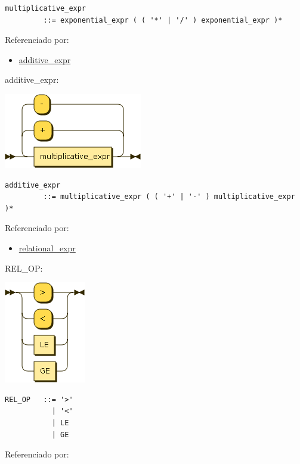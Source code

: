 \begin{verbatim}
multiplicative_expr
         ::= exponential_expr ( ( '*' | '/' ) exponential_expr )*
\end{verbatim}

Referenciado por:

\begin{itemize}
\tightlist
\item
  \protect\hyperlink{additive_expr}{additive\_expr}
\end{itemize}

\protect\hypertarget{additive_expr}{}{additive\_expr:}

\includegraphics[width=2.37500in,height=1.29167in]{diagram/additive_expr.png}

\begin{verbatim}
additive_expr
         ::= multiplicative_expr ( ( '+' | '-' ) multiplicative_expr )*
\end{verbatim}

Referenciado por:

\begin{itemize}
\tightlist
\item
  \protect\hyperlink{relational_expr}{relational\_expr}
\end{itemize}

\protect\hypertarget{REL_OP}{}{REL\_OP:}

\includegraphics[width=1.39583in,height=1.75000in]{diagram/REL_OP.png}

\begin{verbatim}
REL_OP   ::= '>'
           | '<'
           | LE
           | GE
\end{verbatim}

Referenciado por:

